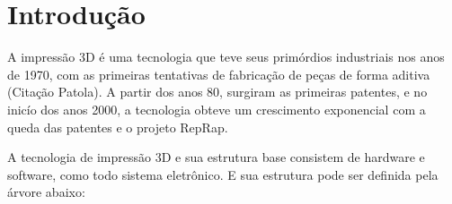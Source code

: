 \section{Introdução}
A impressão 3D é uma tecnologia que teve seus primórdios industriais nos anos de 1970, com as primeiras tentativas de fabricação de peças de forma aditiva (Citação Patola). A partir dos anos 80, surgiram as primeiras patentes, e no inicío dos anos 2000, a tecnologia obteve um crescimento exponencial com a queda das patentes e o projeto RepRap.

A tecnologia de impressão 3D e sua estrutura base consistem de hardware e software, como todo sistema eletrônico. E sua estrutura pode ser definida pela árvore abaixo:
\newline



\newpage

